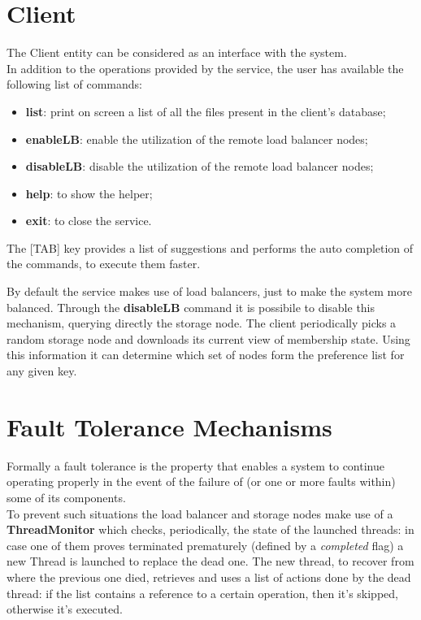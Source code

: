 \documentclass[12pt, a4paper, oneside] {book}
\begin{document}
\section{Client}

The Client entity can be considered as an interface with the system.\\
In addition to the operations provided by the service, the user has available the following list of commands:

\begin{itemize}
  \item \textbf{list}: print on screen a list of all the files present in the client's database;
  \item \textbf{enableLB}: enable the utilization of the remote load balancer nodes;
  \item \textbf{disableLB}: disable the utilization of the remote load balancer nodes;
  \item \textbf{help}: to show the helper;
  \item \textbf{exit}: to close the service.
\end{itemize}

The [TAB] key provides a list of suggestions and performs the auto completion of the commands, to execute them faster.

By default the service makes use of load balancers, just to make the system more balanced.
Through the \textbf{disableLB} command it is possibile to disable this mechanism, querying directly the storage node.
The client periodically picks a random storage node and downloads its current view of membership state.
Using this information it can determine which set of nodes form the preference list for any given key.

\section{Fault Tolerance Mechanisms}

Formally a fault tolerance is the property that enables a system to continue operating properly in the event of the failure of (or one or more faults within) some of its components.\\
To prevent such situations the load balancer and storage nodes make use of a \textbf{ThreadMonitor} which checks, periodically, the state of the launched threads:
in case one of them proves terminated prematurely (defined by a \emph{completed} flag) a new Thread is launched to replace the dead one.
The new thread, to recover from where the previous one died, retrieves and uses a list of actions done by the dead thread:
if the list contains a reference to a certain operation, then it's skipped, otherwise it's executed.
\end{document}
